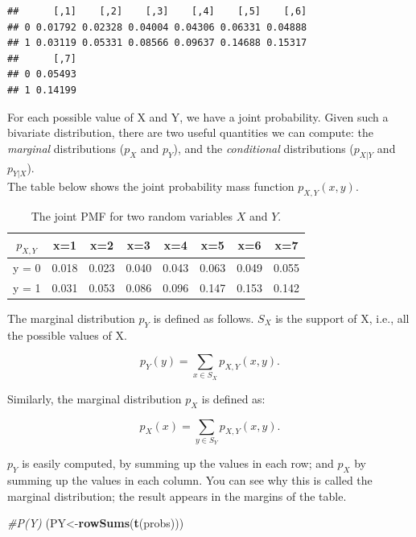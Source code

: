 \documentclass[12pt,]{krantz}
\newenvironment{Shaded}{\begin{snugshade}}{\end{snugshade}}
\newcommand{\CommentTok}[1]{\textcolor[rgb]{0.56,0.35,0.01}{\textit{#1}}}
\newcommand{\KeywordTok}[1]{\textcolor[rgb]{0.13,0.29,0.53}{\textbf{#1}}}
\newcommand{\NormalTok}[1]{#1}
\begin{document}
\begin{verbatim}
##      [,1]    [,2]    [,3]    [,4]    [,5]    [,6]
## 0 0.01792 0.02328 0.04004 0.04306 0.06331 0.04888
## 1 0.03119 0.05331 0.08566 0.09637 0.14688 0.15317
##      [,7]
## 0 0.05493
## 1 0.14199
\end{verbatim}

For each possible value of X and Y, we have a joint probability. Given such a bivariate distribution, there are two useful quantities we can compute: the \emph{marginal} distributions (\(p_{X}\) and \(p_Y\)), and the \emph{conditional} distributions (\(p_{X|Y}\) and \(p_{Y|X}\)).\\
The table below shows the joint probability mass function \(p_{X,Y}(x,y)\).

\begin{table}[!htbp] 
\begin{center}
\begin{tabular}{c|ccccccc}
$p_{X,Y}$ & x=1 & x=2 & x=3 & x=4 & x=5 & x=6 & x=7\\
\hline
y = 0 & 0.018 & 0.023 & 0.040 & 0.043 & 0.063 & 0.049 & 0.055\\
y = 1 & 0.031 & 0.053 & 0.086 & 0.096 &  0.147 & 0.153 &  0.142\\
\end{tabular}
\end{center}
\caption{The joint PMF for two random variables $X$ and $Y$.}\label{discretebivartable}
\end{table}

The marginal distribution \(p_Y\) is defined as follows. \(S_{X}\) is the support of X, i.e., all the possible values of X.

\begin{equation}
p_{Y}(y)=\sum_{x\in S_{X}}p_{X,Y}(x,y).\label{eq-marginal-pmf}
\end{equation}

Similarly, the marginal distribution \(p_X\) is defined as:

\begin{equation}
p_{X}(x)=\sum_{y\in S_{Y}}p_{X,Y}(x,y).\label{eq-marginal-pmf2}
\end{equation}

\(p_Y\) is easily computed, by summing up the values in each row; and \(p_X\) by summing up the values in each column. You can see why this is called the marginal distribution; the result appears in the margins of the table.

\begin{Shaded}
\begin{Highlighting}[]
\CommentTok{#P(Y)}
\NormalTok{(PY<-}\KeywordTok{rowSums}\NormalTok{(}\KeywordTok{t}\NormalTok{(probs)))}
\end{Highlighting}
\end{Shaded}
\end{document}
